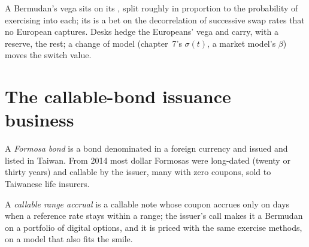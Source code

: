 \begin{remark}\label{rem:rc:bermudans-and-callables:hedge}
A Bermudan's vega sits on its , split roughly in proportion
to the probability of exercising into each; its  is a bet on the
decorrelation of successive swap rates that no European captures. Desks hedge the
Europeans' vega and carry, with a reserve, the rest; a change of model (chapter~7's
$\sigma(t)$, a market model's $\beta$) moves the switch value.
\end{remark}

\section{The callable-bond issuance business}

\begin{definition}\label{def:rc:bermudans-and-callables:formosa}
A \emph{Formosa bond} is a bond denominated in a foreign
currency and issued and listed in Taiwan. From 2014 most dollar Formosas were
long-dated (twenty or thirty years) and callable by the issuer, many with zero
coupons, sold to Taiwanese life insurers.
\end{definition}

\begin{definition}\label{def:rc:bermudans-and-callables:rangeaccrual}
A \emph{callable range accrual} is a callable note
whose coupon accrues only on days when a reference rate stays within a range; the
issuer's call makes it a Bermudan on a portfolio of digital options, and it is
priced with the same exercise methods, on a model that also fits the smile.
\end{definition}

